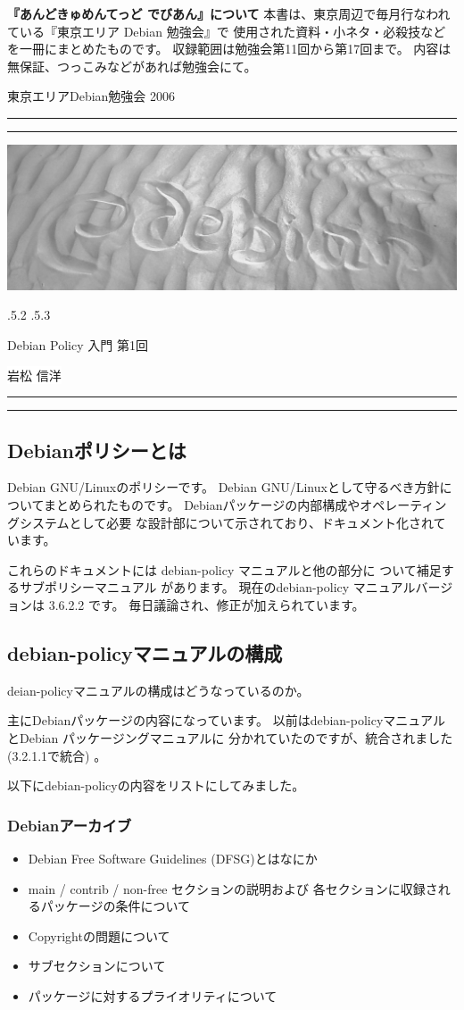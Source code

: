 \documentclass[mingoth,a4paper]{jsarticle}
\makeatletter
\renewcommand{\section}{\@startsection{section}{1}{\z@}%
    {\Cvs \@plus.5\Cdp \@minus.2\Cdp}%
    {.5\Cvs \@plus.3\Cdp}%
    {\normalfont\Huge\headfont\raggedright\centering}} %
\newcommand{\dancersection}[2]{%
\newpage
東京エリアDebian勉強会 2006
\hrule
\vspace{0.5mm}
\hrule
\hfill{}\includegraphics[width=16cm]{image2006-natsu/guruguru-sand-light.png}\\
\vspace{-5cm}
\begin{center}
\section{#1}
\end{center}
\hfill{}\colorbox{white}{#2}\hspace{3cm}\space\\
\vspace{1cm}
\hrule
\vspace{0.5mm}
\hrule
\vspace{1cm}
}
\makeatother
\begin{document}
\newpage
\setcounter{tocdepth}{1}
\tableofcontents
\vspace{6cm}

\large
\begin{itembox}{\bf『あんどきゅめんてっど でびあん』について}
本書は、東京周辺で毎月行なわれている『東京エリア Debian 勉強会』で
使用された資料・小ネタ・必殺技などを一冊にまとめたものです。
収録範囲は勉強会第11回から第17回まで。
内容は無保証、つっこみなどがあれば勉強会にて。
\end{itembox}
\normalfont


\dancersection{Debian Policy 入門 第1回}{岩松 信洋}

\subsection{Debianポリシーとは}
    Debian GNU/Linuxのポリシーです。
    Debian GNU/Linuxとして守るべき方針についてまとめられたものです。
    Debianパッケージの内部構成やオペレーティングシステムとして必要
    な設計部について示されており、ドキュメント化されています。

    これらのドキュメントには debian-policy マニュアルと他の部分に
    ついて補足するサブポリシーマニュアル があります。
    現在のdebian-policy マニュアルバージョンは 3.6.2.2 です。
    毎日議論され、修正が加えられています。


\subsection{debian-policyマニュアルの構成}
    deian-policyマニュアルの構成はどうなっているのか。

    主にDebianパッケージの内容になっています。
    以前はdebian-policyマニュアルとDebian パッケージングマニュアルに
    分かれていたのですが、統合されました (3.2.1.1で統合) 。

    以下にdebian-policyの内容をリストにしてみました。

    \subsubsection{Debianアーカイブ}
\begin{itemize}
        \item Debian Free Software Guidelines (DFSG)とはなにか
        \item main / contrib / non-free セクションの説明および
          各セクションに収録されるパッケージの条件について
        \item Copyrightの問題について
        \item サブセクションについて
        \item パッケージに対するプライオリティについて
\end{itemize}
\end{document}
